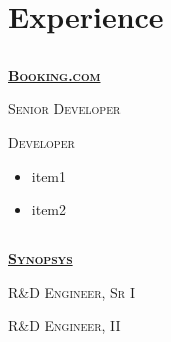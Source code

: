 \documentclass{article}
\begin{document}
\section{Experience}
\subsection[Booking.com]{}
{\raggedright{\textsc{\textbf{\href{https://www.booking.com/}{Booking.com}}}}} \hfill {}

{\raggedright{\textsc{Senior Developer}}} \hfill {}

{\raggedright{\textsc{Developer}}} \hfill {}

\begin{itemize}[noitemsep,nolistsep]
\item item1
\item item2
\end{itemize}

\subsection[Synopsys]{}

{\raggedright{\textsc{\textbf{\href{https://www.synopsys.com/}{Synopsys}}}}} \hfill {}

{\raggedright{\textsc{R\&D Engineer, Sr I}}} \hfill {}

{\raggedright{\textsc{R\&D Engineer, II}}} \hfill {}
\end{document}
